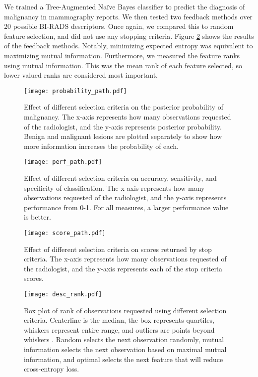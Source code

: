 
\clearpage
We trained a Tree-Augmented Na\"{i}ve Bayes classifier to predict the diagnosis of malignancy in mammography reports. We then tested two feedback methods over 20 possible BI-RADS descriptors. Once again, we compared this to random feature selection, and did not use any stopping criteria. Figure \ref{fig:feedback_performance} shows the results of the feedback methods. Notably, minimizing expected entropy was equivalent to maximizing mutual information. Furthermore, we measured the feature ranks using mutual information. This was the mean rank of each feature selected, so lower valued ranks are considered most important.

\begin{figure}[h]
	\centering
	\texttt{[image: probability\_path.pdf]}
	\caption{Effect of different selection criteria on the posterior probability of malignancy. The x-axis represents how many observations requested of the radiologist, and the y-axis represents posterior probability. Benign and malignant lesions are plotted separately to show how more information increases the probability of each. }
	\label{fig:feedback_mammo}
\end{figure}


\begin{figure}[h]
	\centering
	\texttt{[image: perf\_path.pdf]}
	\caption{Effect of different selection criteria on accuracy, sensitivity, and specificity of classification. The x-axis represents how many observations requested of the radiologist, and the y-axis represents performance from 0-1. For all measures, a larger performance value is better.}
	\label{fig:feedback_performance}
\end{figure}

\begin{figure}[h]
	\centering
	\texttt{[image: score\_path.pdf]}
	\caption{Effect of different selection criteria on scores returned by stop criteria. The x-axis represents how many observations requested of the radiologist, and the y-axis represents each of the stop criteria scores.}
	\label{fig:feedback_score_path}
\end{figure}

\begin{figure}[h]
	\centering
	\texttt{[image: desc\_rank.pdf]}
	\caption{Box plot of rank of observations requested using different selection criteria. Centerline is the median, the box represents quartiles, whiskers represent entire range, and outliers are points beyond whiskers . Random selects the next observation randomly, mutual information selects the next observation based on maximal mutual information, and optimal selects the next feature that will reduce cross-entropy loss.}
	\label{fig:feedback_mammo_ranks}
\end{figure}


